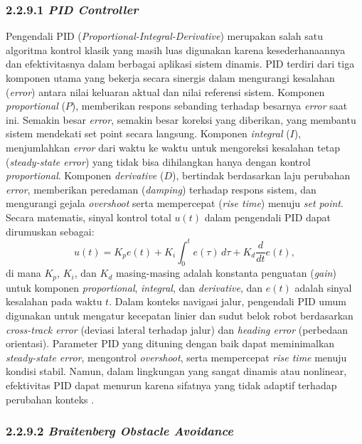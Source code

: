 \subsubsection{2.2.9.1 \emph{PID Controller}}

Pengendali PID (\emph{Proportional-Integral-Derivative}) merupakan salah satu algoritma kontrol klasik yang masih luas digunakan karena kesederhanaannya dan efektivitasnya dalam berbagai aplikasi sistem dinamis. PID terdiri dari tiga komponen utama yang bekerja secara sinergis dalam mengurangi kesalahan (\emph{error}) antara nilai keluaran aktual dan nilai referensi sistem. Komponen  \emph{proportional} (\(P\)), memberikan respons sebanding terhadap besarnya \emph{error} saat ini. Semakin besar \emph{error}, semakin besar koreksi yang diberikan, yang membantu sistem mendekati set point secara langsung. Komponen  \emph{integral} (\(I\)), menjumlahkan \emph{error} dari waktu ke waktu untuk mengoreksi kesalahan tetap (\emph{steady-state error}) yang tidak bisa dihilangkan hanya dengan kontrol \emph{proportional}. Komponen \emph{derivative} (\(D\)), bertindak berdasarkan laju perubahan \emph{error}, memberikan peredaman (\emph{damping}) terhadap respons sistem, dan mengurangi gejala \emph{overshoot} serta mempercepat  (\emph{rise time}) menuju \emph{set point}. Secara matematis, sinyal kontrol total \( u(t) \) dalam pengendali PID dapat dirumuskan sebagai:
\begin{equation}
    u(t) = K_p e(t) + K_i \int_{0}^{t} e(\tau) \, d\tau + K_d \frac{d}{dt}e(t),
\end{equation}
di mana \( K_p \), \( K_i \), dan \( K_d \) masing-masing adalah konstanta penguatan (\emph{gain}) untuk komponen \emph{proportional}, \emph{integral}, dan \emph{derivative}, dan \( e(t) \) adalah sinyal kesalahan pada waktu \( t \). Dalam konteks navigasi jalur, pengendali PID umum digunakan untuk mengatur kecepatan linier dan sudut belok robot berdasarkan \emph{cross-track error} (deviasi lateral terhadap jalur) dan \emph{heading error} (perbedaan orientasi). Parameter PID yang dituning dengan baik dapat meminimalkan \emph{steady-state error}, mengontrol \emph{overshoot}, serta mempercepat \emph{rise time} menuju kondisi stabil. Namun, dalam lingkungan yang sangat dinamis atau nonlinear, efektivitas PID dapat menurun karena sifatnya yang tidak adaptif terhadap perubahan konteks \cite{astrom1995pid}.


\subsubsection{2.2.9.2 \emph{Braitenberg Obstacle Avoidance}}

